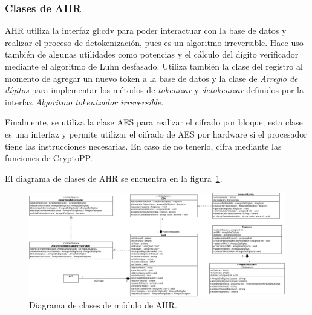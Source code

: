 %
%
%

\subsubsection{Clases de AHR}

AHR utiliza la interfaz \acrshort{gl:cdv} para poder interactuar con la base de
datos y realizar el proceso de detokenización, pues es un algoritmo
irreversible. Hace uso también de algunas utilidades como potencias y
el cálculo del dígito verificador mediante el algoritmo de Luhn desfasado.
Utiliza también la clase del registro al momento de agregar un nuevo token
a la base de datos y la clase de \textit{Arreglo de dígitos} para implementar
los métodos de \textit{tokenizar} y \textit{detokenizar} definidos por la
interfaz \textit{Algoritmo tokenizador irreversible}.

Finalmente, se utiliza la clase AES para realizar el cifrado por bloque; esta
clase es una interfaz y permite utilizar el cifrado de AES por hardware si
el procesador tiene las instrucciones necesarias. En caso de no tenerlo,
cifra mediante las funciones de CryptoPP.

El diagrama de clases de AHR se encuentra en la figura~\ref{clases_ahr}.
\begin{figure}
  \begin{center}
    \includegraphics[width=1.0\linewidth]{diagramas/ahr.png}
    \caption{Diagrama de clases de módulo de AHR.}
    \label{clases_ahr}
  \end{center}
\end{figure}
